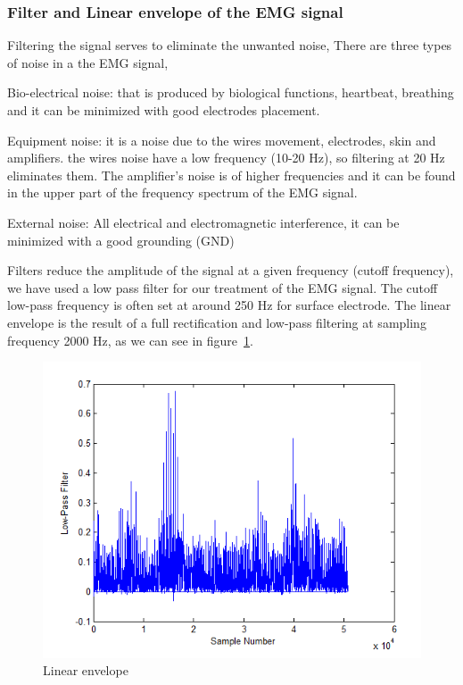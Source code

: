 \documentclass[conference]{IEEEtran}
\begin{document}
\subsubsection{Filter and Linear envelope of the EMG signal } \label{sub:LinearenvelopeoftheEMGsignal}\par
Filtering the signal serves to eliminate the unwanted noise, There are three types of noise in a the EMG signal, \par
Bio-electrical noise: that is produced by biological functions, heartbeat, breathing and it can be minimized with good electrodes placement.\par

Equipment noise: it is a noise due to the wires movement, electrodes, skin and amplifiers. the wires noise have a low frequency (10-20 Hz), so filtering at 20 Hz eliminates them. The amplifier's noise is of higher frequencies and it can be found in the upper part of the frequency spectrum of the EMG signal.\par

External noise: All electrical and electromagnetic interference, it can be minimized with a good grounding (GND)

Filters reduce the amplitude of the signal at a given frequency (cutoff frequency), we have used a low pass filter for our treatment of the EMG signal. The cutoff low-pass frequency is often set at around 250 Hz for surface electrode. The linear envelope is the result of a full rectification and low-pass filtering at sampling frequency 2000 Hz, as we can see in figure~\ref{fig:env}.\par

\begin{figure}
    \hspace*{1.2 cm}
    \includegraphics[scale=0.40]{fig3.png}
    \caption{Linear envelope}
    \label{fig:env}
\end{figure}
\end{document}
